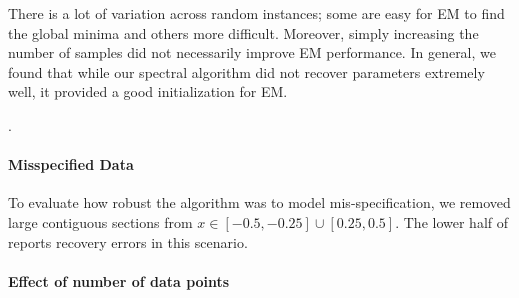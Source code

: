 There is a lot of variation across random instances; some are easy for
EM to find the global minima and others more difficult. Moreover, simply
increasing the number of samples did not necessarily improve EM
performance. In general, we found that while our spectral algorithm did
not recover parameters extremely well, it provided a good initialization
for EM. 

.

\paragraph{Misspecified Data}

To evaluate how robust the algorithm was to model mis-specification, we
removed large contiguous sections from $x \in [-0.5,-0.25] \cup
[0.25,0.5]$. The lower half of  reports
recovery errors in this scenario. 

\paragraph{Effect of number of data points}

\begin{figure}[t]
  \centering
    \hspace{-2em}
  \caption{}
  \label{fig:vs-n}
\end{figure}

